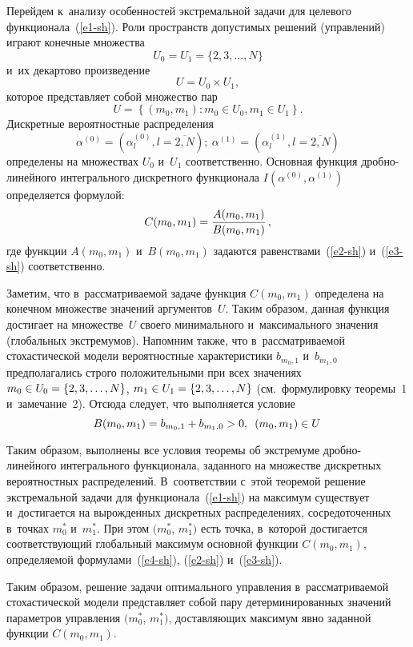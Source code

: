 \begin{multicols}{2}
Перейдем к~анализу особенностей экстремальной задачи для целевого функционала~(\ref{e1-sh}). 
Роли пространств допустимых решений (управ\-ле\-ний) играют конечные множества 
$$
U_0=U_1=\{2,3,\dots,N\}
$$ 
и~их декартово произведение 
$$
U=U_0\times U_1,
$$
 которое 
представляет собой множество пар 
$$
U=\left\{(m_0,m_1): m_0\in U_0, m_1 \in 
U_1\right\}.
$$
 Дискретные вероятностные распределения 
$$
\alpha^{(0)}=\left(\alpha_l^{(0)}, l=\overline{2,N}\right);\ 
\alpha^{(1)}=\left(\alpha_l^{(1)}, l=\overline{2,N}\right)
$$
 определены на 
множествах $U_0$ и~$U_1$ соответственно. Основная функция дроб\-но-ли\-ней\-но\-го 
интегрального дискретного функционала    $I(\alpha^{(0)}, 
\alpha^{(1)})$ определяется формулой:
\begin{equation}
C(m_{0},m_{1})=\displaystyle\frac{\displaystyle A(m_{0},m_{1})\mathstrut}{\displaystyle B(m_{0},m_{1})\mathstrut}\,, \label{e4-sh}
\end{equation}
где функции $A(m_{0},m_{1})$ и~$B(m_{0},m_{1})$ задаются равенствами~(\ref{e2-sh}) и~(\ref{e3-sh}) 
соответственно.

Заметим, что в~рас\-смат\-ри\-ва\-емой задаче функция $C(m_{0},m_{1})$ определена на 
конечном множестве значений аргументов~$U$.
Таким образом, данная функция достигает на множестве~$U$ своего минимального и~максимального значения (глобальных
экстремумов). Напомним так\-же, что в~рас\-смат\-ри\-ва\-емой сто\-ха\-сти\-че\-ской модели 
вероятностные характеристики $b_{m_0,1}$ и~$b_{m_1,0}$ предполагались строго 
положительными при всех значениях $m_0\hm\in U_0 \hm= \{2,3,\dots,N\}$, $m_1\hm\in U_1 \hm= 
\{2,3,\dots,N\}$ (см.\ формулировку тео\-ре\-мы~1 и~замечание~2). Отсюда следует, что 
выполняется условие
$$
B(m_{0},m_{1})=b_{m_{0},1}+b_{m_{1},0} >0,\enskip (m_{0},m_{1})\in U \,
$$

Таким образом, выполнены все условия тео\-ре\-мы об экстремуме дроб\-но-ли\-ней\-но\-го 
интегрального функционала, заданного на множестве дискретных вероятностных 
распределений. В~соответствии с~этой тео\-ре\-мой решение
экстремальной задачи для функционала~(\ref{e1-sh}) на максимум существует и~достигается на 
вы\-рож\-ден\-ных
дискретных распределениях, сосредоточенных в~точках $m_{0}^{*}$ и~$m_{1}^{*}$. При 
этом $(m_{0}^{*}$, $m_{1}^{*})$ есть точка, в~которой достигается со\-от\-вет\-ст\-ву\-ющий 
глобальный
максимум основной функции $C(m_{0},m_{1})$, определяемой формулами~(\ref{e4-sh}), (\ref{e2-sh}) и~(\ref{e3-sh}).

Таким образом, решение задачи оптимального управления в~рас\-смат\-ри\-ва\-емой 
стохастической модели пред\-став\-ля\-ет собой пару детерминированных значений 
па\-ра\-мет\-ров управ\-ле\-ния $(m_{0}^{*}$, $m_{1}^{*})$, до\-став\-ля\-ющих максимум явно 
заданной функции $C(m_{0},m_{1})$.


\end{multicols}
